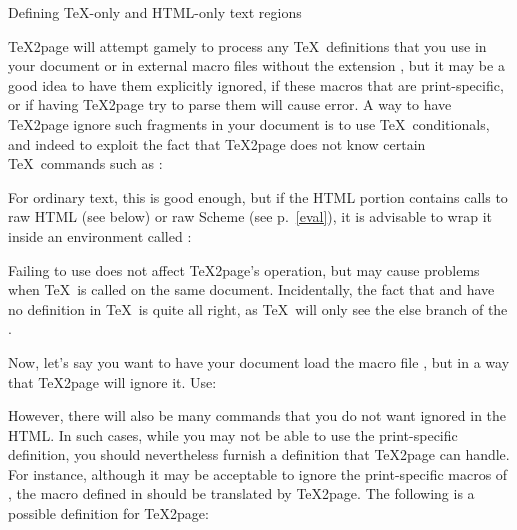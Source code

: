 \beginsection Defining \TeX-only and HTML-only text regions

\TeX2page will attempt gamely to process any \TeX\
definitions that you use in your document or in
external macro files without the extension ,
but it may be a good idea to have them explicitly
ignored, if these
macros that are print-specific, or if
having \TeX2page try to parse them will cause error.  A way
to have \TeX2page ignore such fragments in your document
is  to use
\TeX\ conditionals, and indeed to exploit the
fact that \TeX2page does not know certain \TeX\ commands
such as \p{\shipout}:


\n For ordinary text, this is good enough, but
if the HTML portion contains calls to raw HTML (see
below) or raw
Scheme (see p.~\ref{eval}), it is advisable to wrap it inside
an environment called
\p{\htmlonly}:


\n Failing to use \p{\htmlonly} does not affect
\TeX2page's operation, but may cause problems when \TeX\
is called on the same document.
Incidentally, the fact that \p{\htmlonly} and \p{\endhtmlonly}
have no definition in \TeX\ is quite all right, as \TeX\
will only see the else branch of the \p{\ifx}.

Now, let's say you want to have  your document load the macro file
\p{manmac.tex}, but in a way that \TeX2page will ignore
it.  Use:

\index{input@\p{}}
\p{
\ifx\shipout\UnDeFiNeD
\else
  
\fi
}

\n However, there will also be many  commands that
you do not want ignored in the HTML.  In such
cases, while you may not be able to use the print-specific
definition, you should nevertheless furnish a definition that \TeX2page
can handle.  For instance, although it may be acceptable
to ignore the print-specific macros of \p{manmac}, the
\p{\bull} macro defined in \p{manmac} should be
translated by \TeX2page.  The following is a possible
definition for \TeX2page:

\index{def@\p{\def}}
\p{
\def\bull{{\bf *}}
}

